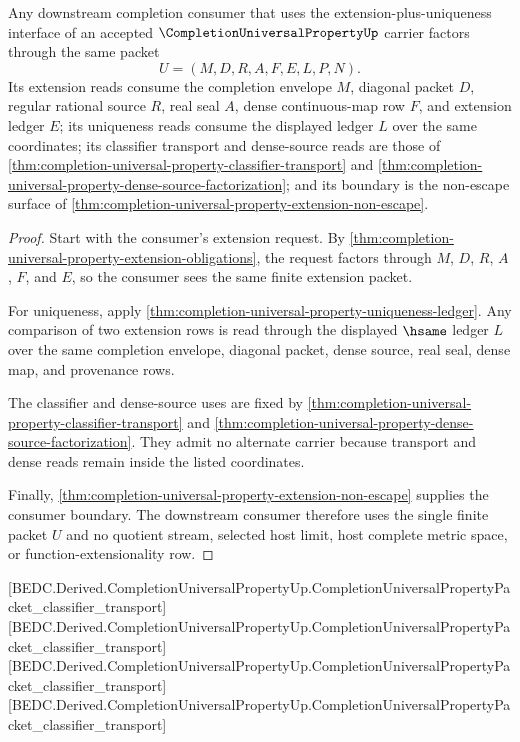 \begin{theorem}
\label{thm:completion-universal-property-downstream-consumer-use}
Any downstream completion consumer that uses the extension-plus-uniqueness interface of an accepted $\CompletionUniversalPropertyUp$ carrier factors through the same packet
$$
U=(M,D,R,A,F,E,L,P,N).
$$
Its extension reads consume the completion envelope $M$, diagonal packet $D$, regular rational source $R$, real seal $A$, dense continuous-map row $F$, and extension ledger $E$; its uniqueness reads consume the displayed ledger $L$ over the same coordinates; its classifier transport and dense-source reads are those of \autoref{thm:completion-universal-property-classifier-transport} and \autoref{thm:completion-universal-property-dense-source-factorization}; and its boundary is the non-escape surface of \autoref{thm:completion-universal-property-extension-non-escape}.
\end{theorem}
\begin{proof}
Start with the consumer's extension request. By \autoref{thm:completion-universal-property-extension-obligations}, the request factors through $M$, $D$, $R$, $A$, $F$, and $E$, so the consumer sees the same finite extension packet.

For uniqueness, apply \autoref{thm:completion-universal-property-uniqueness-ledger}. Any comparison of two extension rows is read through the displayed $\hsame$ ledger $L$ over the same completion envelope, diagonal packet, dense source, real seal, dense map, and provenance rows.

The classifier and dense-source uses are fixed by \autoref{thm:completion-universal-property-classifier-transport} and \autoref{thm:completion-universal-property-dense-source-factorization}. They admit no alternate carrier because transport and dense reads remain inside the listed coordinates.

Finally, \autoref{thm:completion-universal-property-extension-non-escape} supplies the consumer boundary. The downstream consumer therefore uses the single finite packet $U$ and no quotient stream, selected host limit, host complete metric space, or function-extensionality row.
\end{proof}

[BEDC.Derived.CompletionUniversalPropertyUp.CompletionUniversalPropertyPacket\_classifier\_transport]
[BEDC.Derived.CompletionUniversalPropertyUp.CompletionUniversalPropertyPacket\_classifier\_transport]
[BEDC.Derived.CompletionUniversalPropertyUp.CompletionUniversalPropertyPacket\_classifier\_transport]
[BEDC.Derived.CompletionUniversalPropertyUp.CompletionUniversalPropertyPacket\_classifier\_transport]

